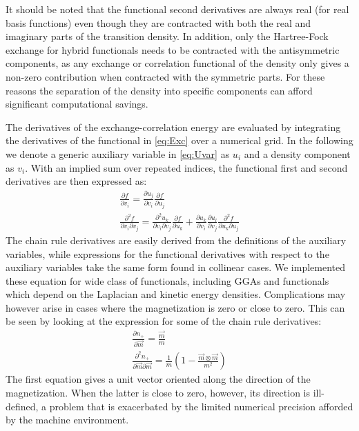 \documentclass[12pt]{article}
\begin{document}
It should be noted that the functional second derivatives are always real (for real basis functions) even though they are contracted with both the real and imaginary parts of the transition density. In addition, only the Hartree-Fock exchange for hybrid functionals needs to be contracted with the antisymmetric components, as any exchange or correlation functional of the density only gives a non-zero contribution when contracted with the symmetric parts.
For these reasons the separation of the density into specific components can afford significant computational savings.

The derivatives of the exchange-correlation energy are evaluated by integrating the derivatives of the functional in \cref{eq:Exc} over a numerical grid.
In the following we denote a generic auxiliary variable in \cref{eq:Uvar} as $u_i$ and a density component as $v_i$.
With an implied sum over repeated indices, the functional first and second derivatives are then expressed as:
\begin{gather}
 \frac{\partial f}{\partial v_i} = \frac{\partial u_j}{\partial v_i}\frac{\partial f}{\partial u_j} \\
 \frac{\partial^2 f}{\partial v_i\partial v_j} = \frac{\partial^2 u_k}{\partial v_i\partial v_j}\frac{\partial f}{\partial u_k} +
  \frac{\partial u_k}{\partial v_i}\frac{\partial u_l}{\partial v_j}\frac{\partial^2 f}{\partial u_k\partial u_j}
\end{gather}
The chain rule derivatives are easily derived from the definitions of the auxiliary variables, while expressions for the functional derivatives with respect to the auxiliary variables take the same form found in collinear cases.
We implemented these equation for wide class of functionals, including GGAs and functionals which depend on the Laplacian and kinetic energy densities.
Complications may however arise in cases where the magnetization is zero or close to zero.
This can be seen by looking at the expression for some of the chain rule derivatives:
\begin{gather}
 \frac{\partial n_+}{\partial\vec{m}} = \frac{\vec{m}}{m} \\
 \frac{\partial^2 n_+}{\partial\vec{m}\partial\vec{m}} = \frac{1}{m}\left(1-\frac{\vec{m}\otimes\vec{m}}{m^2}\right)
 \label{eq:chrule}
\end{gather}
The first equation gives a unit vector oriented along the direction of the magnetization.
When the latter is close to zero, however, its direction is ill-defined, a problem that is exacerbated by the limited numerical precision afforded by the machine environment.
\end{document}
